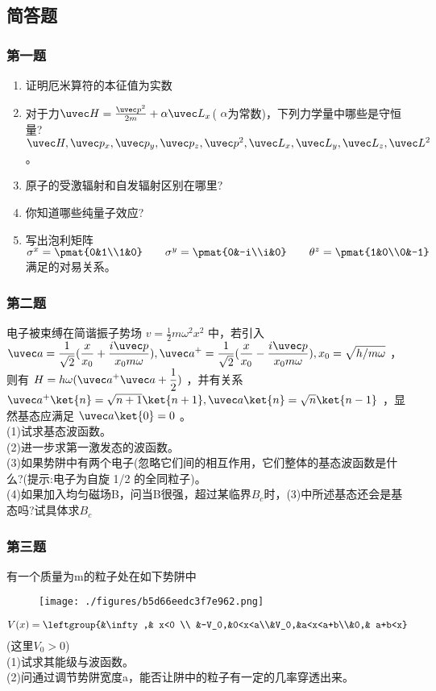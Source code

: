 
\subsection{简答题}
\subsubsection{第一题}
\begin{enumerate}
\item 证明厄米算符的本征值为实数
\item 对于力$\uvec H=\frac{\uvec p^2}{2m}+\alpha \uvec L_x$( $\alpha$为常数)，下列力学量中哪些是守恒量?\\
$\uvec H,\uvec p_x,\uvec p_y,\uvec p_z,\uvec p^2,\uvec L_x,\uvec L_y,\uvec L_z,\uvec L^2$。
\item 原子的受激辐射和自发辐射区别在哪里?
\item 你知道哪些纯量子效应?
\item 写出泡利矩阵
$\sigma^x=\pmat{0&1\\1&0}\qquad \sigma^y=\pmat{0&-i\\i&0}\qquad \theta^z=\pmat{1&0\\0&-1}$满足的对易关系。
\end{enumerate}
\subsubsection{第二题}
电子被束缚在简谐振子势场 $v=\frac{1}{2}m\omega^2x^2$  中，若引入 $\displaystyle \uvec a =\frac{1}{\sqrt{2}}(\frac{x}{x_0}+\frac{i\uvec p}{x_0m\omega}),\uvec a^+ =\frac{1}{\sqrt{2}}(\frac{x}{x_0}-\frac{i\uvec p}{x_0m\omega}),x_0=\sqrt{h/m\omega}$ ，则有 $\displaystyle H=h\omega(\uvec a^+ \uvec a+\frac{1}{2})$ ，并有关系 $\uvec a^+ \ket{n}=\sqrt{n+1}\ket{n+1},\uvec a \ket{n}=\sqrt{n}\ket{n-1}$ ，显然基态应满足 $\uvec a\ket{0}=0$ 。\\
(1)试求基态波函数。\\
(2)进一步求第一激发态的波函数。\\
(3)如果势阱中有两个电子(忽略它们间的相互作用，它们整体的基态波函数是什么?(提示:电子为自旋 1/2 的全同粒子)。\\
(4)如果加入均匀磁场B，问当B很强，超过某临界$B_c$时，(3)中所述基态还会是基态吗?试具体求$B_c$
\subsubsection{第三题}
有一个质量为m的粒子处在如下势阱中
\begin{figure}[ht]
\centering
\texttt{[image: ./figures/b5d66eedc3f7e962.png]}
\caption{} \label{fig_ZDLZ12_1}
\end{figure}
\begin{equation}
V(x)=\leftgroup{&\infty,& x<0 \\ &-V_0,&0<x<a\\&V_0,&a<x<a+b\\&0,& a+b<x}~
\end{equation}
(这里$V_0>0$)\\
(1)试求其能级与波函数。\\
(2)问通过调节势阱宽度a，能否让阱中的粒子有一定的几率穿透出来。
